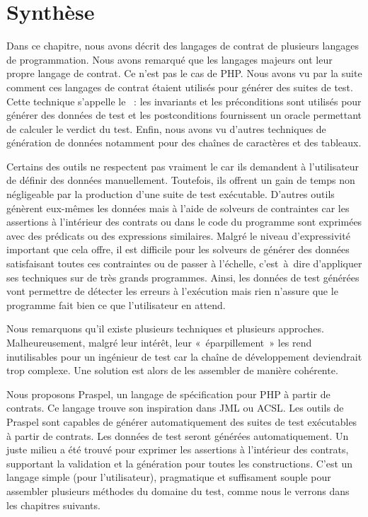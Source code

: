 \section{Synthèse}
\label{section:sota:summary}

Dans ce chapitre, nous avons décrit des langages de contrat de plusieurs
langages de programmation. Nous avons remarqué que les langages majeurs ont leur
propre langage de contrat. Ce n'est pas le cas de PHP. Nous avons vu par la
suite comment ces langages de contrat étaient utilisés pour générer des suites
de test. Cette technique s'appelle le ~: les
invariants et les préconditions sont utilisés pour générer des données de test
et les postconditions fournissent un oracle permettant de calculer le verdict du
test. Enfin, nous avons vu d'autres techniques de génération de données
notamment pour des chaînes de caractères et des tableaux.

Certains des outils ne respectent pas vraiment le  car ils demandent à l'utilisateur de définir des données manuellement.
Toutefois, ils offrent un gain de temps non négligeable par la production d'une
suite de test exécutable. D'autres outils génèrent eux-mêmes les données mais à
l'aide de solveurs de contraintes car les assertions à l'intérieur des contrats
ou dans le code du programme sont exprimées avec des prédicats ou des
expressions similaires. Malgré le niveau d'expressivité important que cela
offre, il est difficile pour les solveurs de générer des données satisfaisant
toutes ces contraintes ou de passer à l'échelle, c'est~à~dire d'appliquer ses
techniques sur de très grands programmes. Ainsi, les données de test générées
vont permettre de détecter les erreurs à l'exécution mais rien n'assure que le
programme fait bien ce que l'utilisateur en attend.

Nous remarquons qu'il existe plusieurs techniques et plusieurs approches.
Malheureusement, malgré leur intérêt, leur «~éparpillement~» les rend
inutilisables pour un ingénieur de test car la chaîne de développement
deviendrait trop complexe. Une solution est alors de les assembler de manière
cohérente.

Nous proposons Praspel, un langage de spécification pour PHP à partir de
contrats. Ce langage trouve son inspiration dans JML ou ACSL. Les outils de
Praspel sont capables de générer automatiquement des suites de test exécutables
à partir de contrats. Les données de test seront générées automatiquement. Un
juste milieu a été trouvé pour exprimer les assertions à l'intérieur des
contrats, supportant la validation et la génération pour toutes les
constructions. C'est un langage simple (pour l'utilisateur), pragmatique et
suffisament souple pour assembler plusieurs méthodes du domaine du test, comme
nous le verrons dans les chapitres suivants.
